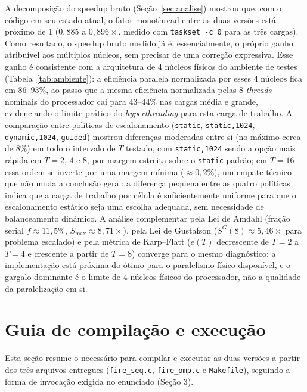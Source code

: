 \documentclass[11pt,a4paper]{article}
\begin{document}
A decomposição do speedup bruto (Seção~\ref{sec:analise}) mostrou que, com o código em seu estado atual, o fator monothread entre as duas versões está próximo de 1 ($0{,}885$ a $0{,}896\times$, medido com \texttt{taskset -c 0} para as três cargas). Como resultado, o speedup bruto medido já é, essencialmente, o próprio ganho atribuível aos múltiplos núcleos, sem precisar de uma correção expressiva. Esse ganho é consistente com a arquitetura de 4 núcleos físicos do ambiente de testes (Tabela~\ref{tab:ambiente}): a eficiência paralela normalizada por esses 4 núcleos fica em $86$--$93\%$, ao passo que a mesma eficiência normalizada pelas 8 \emph{threads} nominais do processador cai para $43$--$44\%$ nas cargas média e grande, evidenciando o limite prático do \emph{hyperthreading} para esta carga de trabalho. A comparação entre políticas de escalonamento (\texttt{static}, \texttt{static,1024}, \texttt{dynamic,1024}, \texttt{guided}) mostrou diferenças moderadas entre si (no máximo cerca de $8\%$) em todo o intervalo de $T$ testado, com \texttt{static,1024} sendo a opção mais rápida em $T=2$, $4$ e $8$, por margem estreita sobre o \texttt{static} padrão; em $T=16$ essa ordem se inverte por uma margem mínima ($\approx 0{,}2\%$), um empate técnico que não muda a conclusão geral: a diferença pequena entre as quatro políticas indica que a carga de trabalho por célula é suficientemente uniforme para que o escalonamento estático seja uma escolha adequada, sem necessidade de balanceamento dinâmico. A análise complementar pela Lei de Amdahl (fração serial $f \approx 11{,}5\%$, $S_\text{max} \approx 8{,}71\times$), pela Lei de Gustafson ($S^G(8) \approx 5{,}46\times$ para problema escalado) e pela métrica de Karp--Flatt ($e(T)$ decrescente de $T=2$ a $T=4$ e crescente a partir de $T=8$) converge para o mesmo diagnóstico: a implementação está próxima do ótimo para o paralelismo físico disponível, e o gargalo dominante é o limite de 4 núcleos físicos do processador, não a qualidade da paralelização em si.

\appendix

\section{Guia de compilação e execução}
\label{sec:apendice-execucao}

Esta seção resume o necessário para compilar e executar as duas versões a partir dos três arquivos entregues (\texttt{fire\_seq.c}, \texttt{fire\_omp.c} e \texttt{Makefile}), seguindo a forma de invocação exigida no enunciado (Seção 3).
\end{document}
